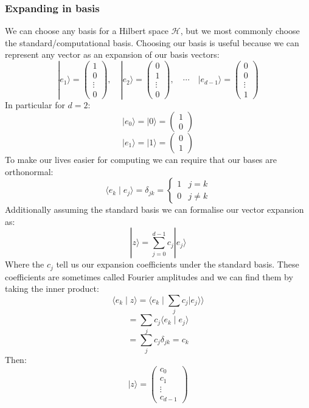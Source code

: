 \documentclass[12pt]{article}
\begin{document}
\subsubsection*{Expanding in basis}
We can choose any basis for a Hilbert space \(\mathcal{H}\), but we most commonly choose the standard/computational basis. Choosing our basis is useful because we can represent any vector as an expansion of our basis vectors:
\[|e_1\rangle=\begin{pmatrix}
    1\\0\\\vdots\\0
\end{pmatrix},\quad |e_2\rangle =\begin{pmatrix}
    0\\1\\\vdots\\0
\end{pmatrix},\quad\cdots\quad|e_{d-1}\rangle=\begin{pmatrix}
    0 \\0 \\ \vdots \\ 1
\end{pmatrix}\]
In particular for \(d=2\):
\[|e_0\rangle = |0\rangle = \begin{pmatrix}
    1 \\ 0
\end{pmatrix}\]
\[|e_1\rangle =|1\rangle =\begin{pmatrix}
    0 \\ 1
\end{pmatrix}\]
To make our lives easier for computing we can require that our bases are orthonormal:
\[\langle e_k\mid e_j\rangle =\delta_{jk}=\begin{cases}
    1 & j=k \\
    0 & j\ne k
\end{cases}\]
Additionally assuming the standard basis we can formalise our vector expansion as:
\[|z\rangle =\sum^{d-1}_{j=0}c_j|e_j\rangle \]
Where the \(c_j\) tell us our expansion coefficients under the standard basis. These coefficients are sometimes called Fourier amplitudes and we can find them by taking the inner product:
\[\langle e_k\mid z\rangle = \langle e_k\mid \sum_{j}c_j|e_j\rangle\rangle \]
\[=\sum_jc_j\langle e_k\mid e_j\rangle\]
\[=\sum_jc_j\delta_{jk}=c_k\]
Then:
\[|z\rangle = \begin{pmatrix}
    c_0\\
    c_1\\
    \vdots\\
    c_{d-1}
\end{pmatrix}\]
\end{document}
